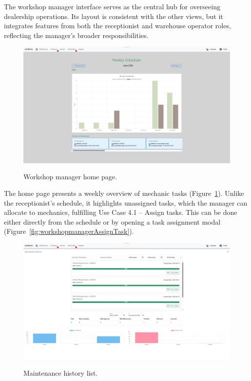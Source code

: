 The workshop manager interface serves as the central hub for overseeing dealership operations. Its layout is consistent with the other views, but it integrates features from both the receptionist and warehouse operator roles, reflecting the manager's broader responsibilities.


\begin{figure}[h]
  \caption{Workshop manager home page.}
  \centering
  \includegraphics[width=\textwidth]{figs/Implementation/workshopmanager/homePage}
  \label{fig:workshopmanagerHomePage}
\end{figure}



The home page presents a weekly overview of mechanic tasks (Figure~\ref{fig:workshopmanagerHomePage}). Unlike the receptionist's schedule, it highlights unassigned tasks, which the manager can allocate to mechanics, fulfilling Use Case 4.1 – Assign tasks. This can be done either directly from the schedule or by opening a task assignment modal (Figure~\ref{fig:workshopmanagerAssignTask}).






\begin{figure}[h]
  \caption{Maintenance history list.}
  \centering
  \includegraphics[width=\textwidth]{figs/Implementation/workshopmanager/maintenanceHistory}
  \label{fig:maintenanceHistory}
\end{figure}



